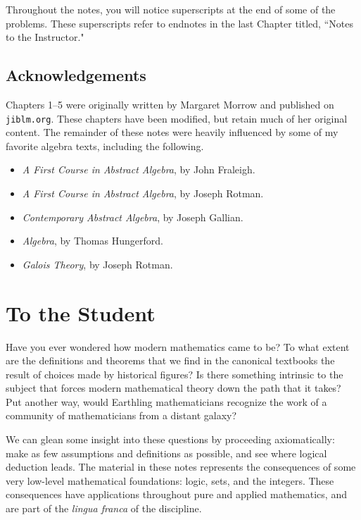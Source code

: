\begin{annotation}
 Throughout the notes, you will notice superscripts at the end of some of the problems. These superscripts refer to endnotes in the last Chapter titled,
 ``Notes to the Instructor."

\section*{Acknowledgements}

Chapters 1--5 were originally written by Margaret Morrow and published on \texttt{jiblm.org}. These chapters have been modified, but retain much of her original content. The remainder of these notes were heavily influenced by some of my favorite algebra texts, including the following.
\begin{itemize}
    \item \textit{A First Course in Abstract Algebra}, by John Fraleigh.
    \item \textit{A First Course in Abstract Algebra}, by Joseph Rotman.
    \item \textit{Contemporary Abstract Algebra}, by Joseph Gallian.
    \item \textit{Algebra}, by Thomas Hungerford.
    \item \textit{Galois Theory}, by Joseph Rotman.
\end{itemize}

\end{annotation}



\chapter{To the Student}

Have you ever wondered how modern mathematics came to be? To what extent are the definitions and theorems that we find in the canonical textbooks the result of choices made by historical figures? Is there something intrinsic to the subject that forces modern mathematical theory down the path that it takes? Put another way, would Earthling mathematicians recognize the work of a community of mathematicians from a distant galaxy?

We can glean some insight into these questions by proceeding axiomatically: make as few assumptions and definitions as possible, and see where logical deduction leads. The material in these notes represents the consequences of some very low-level mathematical foundations: logic, sets, and the integers. These consequences have applications throughout pure and applied mathematics, and are part of the \textit{lingua franca} of the discipline.

